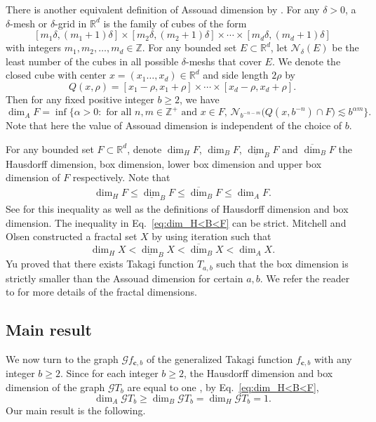 \documentclass{amsart}
\theoremstyle{definition}
\theoremstyle{remark}
\numberwithin{equation}{section}
\newcommand{\Z}{{\mathbb Z}}
\def\N{\mathcal{N}}
\def\R{\mathbb{R}}
\def\g{\mathcal{G}}
\def\bfc{\mathbf{c}}
\begin{document}
There is another equivalent definition of Assouad dimension by \cite{F90,F21}. For any $\delta>0$, a $\delta$-mesh or $\delta$-grid in $\R^d$ is the family of cubes of the form
$$
[m_1 \delta, (m_1+1) \delta ] \times [m_2 \delta,(m_2+1) \delta ]  \times \cdots \times [m_d \delta,(m_d+1) \delta ]	
$$
with integers $m_1,m_2, \ldots ,m_d\in\mathbb{Z}$. For any bounded set $E\subset\mathbb{R}^d$, let $\N_\delta(E)$ be the least number of the cubes in all possible $\delta$-meshs that cover $E$. We denote the closed cube with center $x=(x_1\ldots,x_d)\in\mathbb{R}^d$ and side length $2\rho$ by
$$Q(x,\rho)=[x_1-\rho,x_1+\rho]\times\cdots\times[x_d-\rho,x_d+\rho].$$
Then for any fixed positive integer $b\geq2$, we have
$$
\dim_A F=\inf\big\{\alpha>0:\mbox{ for all }n,m\in\Z^+\mbox{ and }x\in F,\,\N_{b^{-n-m}}\big(Q(x,b^{-n})\cap F\big)\lesssim b^{\alpha m}\big\}. 
$$
Note that here the value of Assouad dimension is independent of the choice of $b$.

For any bounded set $F\subset\mathbb{R}^d$, denote $\dim_H F$, $\dim_B F$, $\underline\dim_B F$ and $\overline\dim_B F$ the  Hausdorff dimension, box dimension, lower box dimension and upper box dimension of $F$ respectively. Note that 
\begin{align}\label{eq:dim_H<B<F}
	\dim_H F\leq\underline\dim_B F\leq\overline\dim_B F\leq\dim_A F.
\end{align}
See \cite{F90,F21} for this inequality as well as the definitions of Hausdorff dimension and box dimension. 
{The inequality in Eq.~\eqref{eq:dim_H<B<F} can be strict.}
Mitchell and Olsen \cite{MO18} constructed a fractal set $X$ by using iteration such that
$$
	\dim_H X <\underline\dim_B X<\overline\dim_B X<\dim_A X.
$$
  Yu \cite{Y20} proved that there exists Takagi function $T_{a,b}$ such that the box dimension is strictly smaller than the Assouad dimension for certain $a,b$. We refer the reader to \cite{ABK24, BC23, CFY22, R23, S18} for more details of the fractal dimensions.


\subsection{Main result}
We now turn to the graph $\g f_{\bfc,b}$ of the generalized Takagi function $f_{\bfc,b}$ with any integer $b \geq2$. Since for each integer $b\geq2$, the Hausdorff dimension and box dimension of the graph $\g T_b $ are equal to one \cite{B15,KMY84}, by Eq.~\eqref{eq:dim_H<B<F},
$$
\dim_A \g T_b \geq\dim_B\g T_b=\dim_H\g T_b=1.
$$
Our main result is the following.
\end{document}
